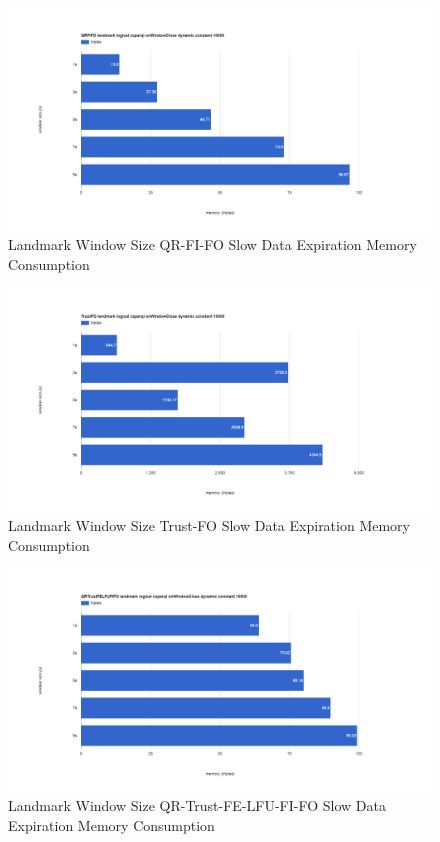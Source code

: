 \begin{figure}[!htbp]
    \centering
    \includegraphics[width=\textwidth]{img/app3-land-ws-qrfifo-slow-m.png}
    \caption{Landmark Window Size QR-FI-FO Slow Data Expiration Memory Consumption}
\end{figure}
\begin{figure}[!htbp]
    \centering
    \includegraphics[width=\textwidth]{img/app3-land-ws-trustfo-slow-m.png}
    \caption{Landmark Window Size Trust-FO Slow Data Expiration Memory Consumption}
\end{figure}
\begin{figure}[!htbp]
    \centering
    \includegraphics[width=\textwidth]{img/app3-land-ws-qrtrustfelfufifo-slow-m.png}
    \caption{Landmark Window Size QR-Trust-FE-LFU-FI-FO Slow Data Expiration Memory Consumption}
\end{figure}

